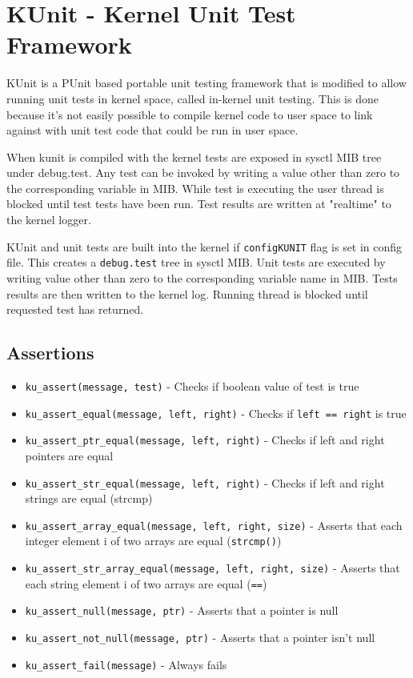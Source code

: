\chapter{KUnit - Kernel Unit Test Framework}

KUnit is a PUnit based portable unit testing framework that is modified to allow
running unit tests in kernel space, called in-kernel unit testing. This is done
because it's not easily possible to compile kernel code to user space to link
against with unit test code that could be run in user space.

When kunit is compiled with the kernel tests are exposed in sysctl MIB tree
under debug.test. Any test can be invoked by writing a value other than zero
to the corresponding variable in MIB. While test is executing the user thread
is blocked until test tests have been run. Test results are written at
"realtime" to the kernel logger.

KUnit and unit tests are built into the kernel if \verb+configKUNIT+ flag is set
in config file. This creates a \verb+debug.test+ tree in sysctl \ac{MIB}. Unit
tests are executed by writing value other than zero to the corresponding
variable name in MIB. Tests results are then written to the kernel log.
Running thread is blocked until requested test has returned.

\section{Assertions}

\begin{itemize}
\item \verb+ku_assert(message, test)+ - Checks if boolean value of test is true
\item \verb+ku_assert_equal(message, left, right)+ - Checks if
      \verb+left == right+ is true
\item \verb+ku_assert_ptr_equal(message, left, right)+ - Checks if left and
      right pointers are equal
\item \verb+ku_assert_str_equal(message, left, right)+ - Checks if left and
      right strings are equal (strcmp)
\item \verb+ku_assert_array_equal(message, left, right, size)+ - Asserts that
      each integer element i of two arrays are equal (\verb+strcmp()+)
\item \verb+ku_assert_str_array_equal(message, left, right, size)+ - Asserts
      that each string element i of two arrays are equal (\verb+==+)
\item \verb+ku_assert_null(message, ptr)+ - Asserts that a pointer is null
\item \verb+ku_assert_not_null(message, ptr)+ - Asserts that a pointer isn't
      null
\item \verb+ku_assert_fail(message)+ - Always fails
\end{itemize}
